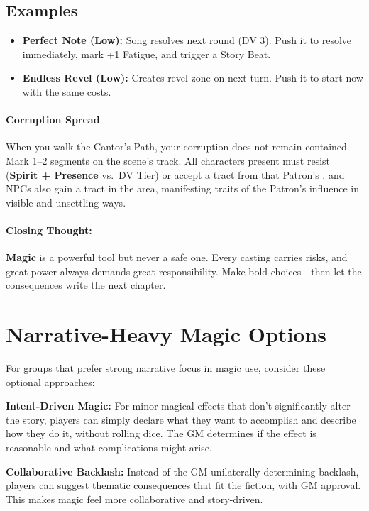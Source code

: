 \subsection*{Examples}
\begin{itemize}
\item \textbf{Perfect Note (Low):} Song resolves next round (DV 3). Push it to resolve immediately, mark +1 Fatigue, and trigger a Story Beat.
\item \textbf{Endless Revel (Low):} Creates revel zone on next turn. Push it to start now with the same costs.
\end{itemize}

\paragraph{Corruption Spread}
When you walk the Cantor’s Path, your corruption does not remain contained. 
Mark 1--2 segments on the scene’s  track. 
All characters present must resist (\textbf{Spirit + Presence} vs.~DV Tier) or accept a tract from that Patron’s . 
 and  NPCs also gain a tract in the area, manifesting traits of the Patron’s influence in visible and unsettling ways.

\paragraph{Closing Thought:}
\textbf{Magic} is a powerful tool but never a safe one. Every casting carries risks, and great power always demands great responsibility. Make bold choices—then let the consequences write the next chapter.

\section{Narrative-Heavy Magic Options}

For groups that prefer strong narrative focus in magic use, consider these optional approaches:

\textbf{Intent-Driven Magic:} For minor magical effects that don't significantly alter the story, players can simply declare what they want to accomplish and describe how they do it, without rolling dice. The GM determines if the effect is reasonable and what complications might arise.

\textbf{Collaborative Backlash:} Instead of the GM unilaterally determining backlash, players can suggest thematic consequences that fit the fiction, with GM approval. This makes magic feel more collaborative and story-driven.

